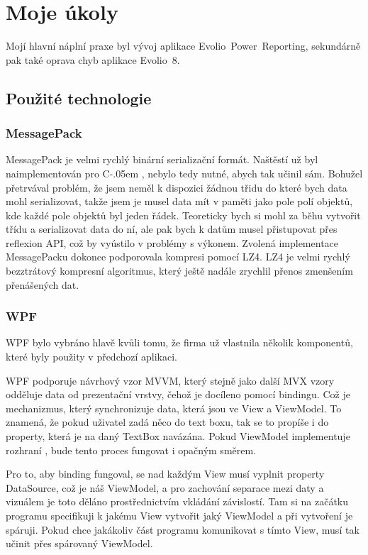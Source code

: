 \documentclass[czech,bachelorpractice,dept460,male,csharp]{diploma}
\newcommand{\EvolioEight}{Evolio~8}
\newcommand{\EFilters}{Evolio~Power~Reporting}
\newcommand{\Csharp}{%
  {\settoheight{\dimen0}{C}C\kern-.05em \resizebox{!}{\dimen0}{\raisebox{\depth}{\#}}}}
\begin{document}
\section{Moje úkoly}
	Mojí hlavní náplní praxe byl vývoj aplikace {\EFilters}, sekundárně pak také oprava chyb aplikace {\EvolioEight}.
	\subsection{Použité technologie}
			\subsubsection{MessagePack}
			MessagePack\cite{mpSpec} je velmi rychlý binární serializační formát. Naštěstí už byl naimplementován pro {\Csharp}, nebylo tedy nutné, abych tak učinil sám. Bohužel přetrvával problém, že jsem neměl k dispozici žádnou třidu do které bych data mohl serializovat, takže jsem je musel data mít v paměti jako pole polí objektů, kde každé pole objektů byl jeden řádek. Teoreticky bych si mohl za běhu vytvořit třídu a serializovat data do ní, ale pak bych k datům musel přistupovat přes reflexion API, což by vyústilo v problémy s výkonem. Zvolená implementace MessagePacku\cite{mpImpl} dokonce podporovala kompresi pomocí LZ4. LZ4\cite{l4z} je velmi rychlý bezztrátový kompresní algoritmus, který ještě nadále zrychlil přenos zmenšením přenášených dat. 
		\subsubsection{WPF}
			WPF\cite{wpf} bylo vybráno hlavě kvůli tomu, že firma už vlastnila několik komponentů, které byly použity v předchozí aplikaci.
			
			WPF podporuje návrhový vzor MVVM\cite{mvvm}, který stejně jako další MVX vzory odděluje data od prezentační vrstvy, čehož je docíleno pomocí bindingu. Což je mechanizmus, který synchronizuje data, která jsou ve View a ViewModel. To znamená, že pokud uživatel zadá něco do text boxu, tak se to propíše i do property, která je na daný TextBox navázána. Pokud ViewModel implementuje rozhraní , bude tento proces fungovat i opačným směrem.
			
			Pro to, aby binding fungoval, se nad každým View musí vyplnit property DataSource, což je náš ViewModel, a pro zachování separace mezi daty a vizuálem je toto děláno prostřednictvím vkládání závislostí. Tam si na začátku programu specifikuji k jakému View vytvořit jaký ViewModel a při vytvoření je spáruji. Pokud chce jakákoliv část programu komunikovat s tímto View, musí tak učinit přes spárovaný ViewModel.
			
\end{document}
